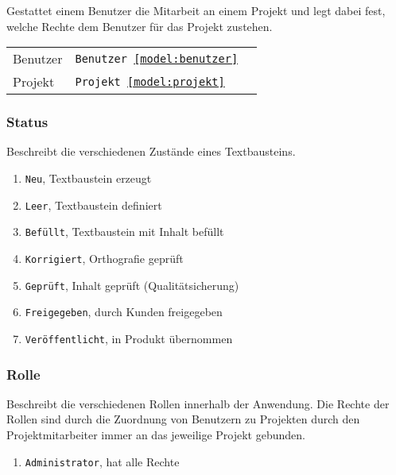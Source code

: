 Gestattet einem Benutzer die Mitarbeit an einem Projekt und legt dabei fest, welche Rechte dem Benutzer für das Projekt zustehen.

\begin{tabular}{@{}l l l}
\hline
Benutzer&\texttt{Benutzer \ref{model:benutzer}}&\\
Projekt&\texttt{Projekt \ref{model:projekt}}&\\
\hline
\end{tabular}

\subsubsection{Status}\label{model:status}

Beschreibt die verschiedenen Zustände eines Textbausteins.

\begin{enumerate}\itemsep -5pt
\item \texttt{Neu}, Textbaustein erzeugt
\item \texttt{Leer}, Textbaustein definiert
\item \texttt{Befüllt}, Textbaustein mit Inhalt befüllt
\item \texttt{Korrigiert}, Orthografie geprüft
\item \texttt{Geprüft}, Inhalt geprüft (Qualitätsicherung)
\item \texttt{Freigegeben}, durch Kunden freigegeben
\item \texttt{Veröffentlicht}, in Produkt übernommen
\end{enumerate}

\subsubsection{Rolle}\label{model:rolle}

Beschreibt die verschiedenen Rollen innerhalb der Anwendung. Die Rechte der Rollen sind durch die Zuordnung von Benutzern zu Projekten durch den Projektmitarbeiter immer an das jeweilige Projekt gebunden.

\begin{enumerate}\itemsep -5pt
\item \texttt{Administrator}, hat alle Rechte 
\end{enumerate}
